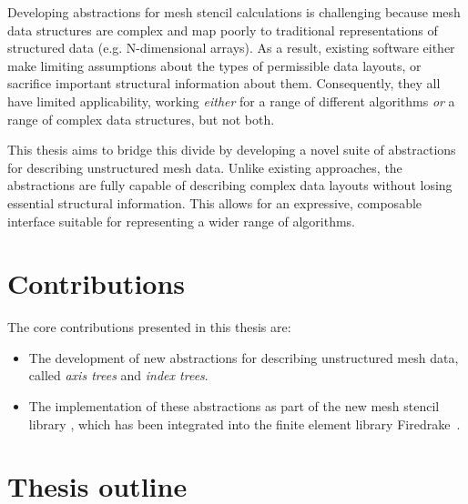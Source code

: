 \documentclass[thesis]{subfiles}
\begin{document}
Developing abstractions for mesh stencil calculations is challenging because mesh data structures are complex and map poorly to traditional representations of structured data (e.g. N-dimensional arrays).
As a result, existing software either make limiting assumptions about the types of permissible data layouts, or sacrifice important structural information about them.
Consequently, they all have limited applicability, working \emph{either} for a range of different algorithms \emph{or} a range of complex data structures, but not both.

This thesis aims to bridge this divide by developing a novel suite of abstractions for describing unstructured mesh data.
Unlike existing approaches, the abstractions are fully capable of describing complex data layouts without losing essential structural information.
This allows for an expressive, composable interface suitable for representing a wider range of algorithms.

\section{Contributions}

The core contributions presented in this thesis are:
\begin{itemize}
  \item The development of new abstractions for describing unstructured mesh data, called \emph{axis trees} and \emph{index trees}.
  \item The implementation of these abstractions as part of the new mesh stencil library , which has been integrated into the finite element library Firedrake~\cite{FiredrakeUserManual}.
\end{itemize}

\section{Thesis outline}
\end{document}
